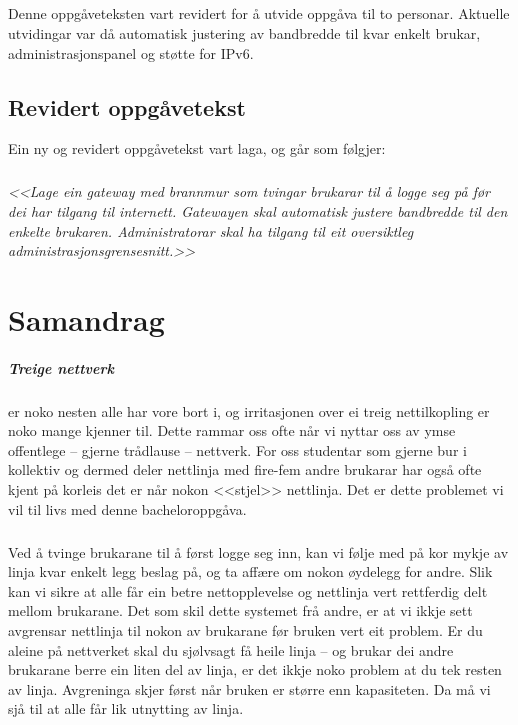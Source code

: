 \documentclass[nynorsk,12pt,a4paper,oneside]{book}
\begin{document}
\paragraph*{}
Denne oppgåveteksten vart revidert for å utvide oppgåva til to personar. Aktuelle utvidingar var då automatisk justering av bandbredde til kvar enkelt brukar, administrasjonspanel og støtte for IPv6.

\section{Revidert oppgåvetekst}
Ein ny og revidert oppgåvetekst vart laga, og går som følgjer:
\paragraph*{}
\emph{<<Lage ein gateway med brannmur som tvingar brukarar til å logge seg på før dei har tilgang til internett. Gatewayen skal automatisk justere bandbredde til den enkelte brukaren. Administratorar skal ha tilgang til eit oversiktleg administrasjonsgrensesnitt.>>}


\chapter{Samandrag}
\paragraph{Treige nettverk} er noko nesten alle har vore bort i, og irritasjonen over ei treig nettilkopling er noko mange kjenner til. Dette rammar oss ofte når vi nyttar oss av ymse offentlege -- gjerne trådlause -- nettverk. For oss studentar som gjerne bur i kollektiv og dermed deler nettlinja med fire-fem andre brukarar har også ofte kjent på korleis det er når nokon <<stjel>> nettlinja. Det er dette problemet vi vil til livs med denne bacheloroppgåva.
\paragraph{}Ved å tvinge brukarane til å først logge seg inn, kan vi følje med på kor mykje av linja kvar enkelt legg beslag på, og ta affære om nokon øydelegg for andre. Slik kan vi sikre at alle får ein betre nettopplevelse og nettlinja vert rettferdig delt mellom brukarane. Det som skil dette systemet frå andre, er at vi ikkje sett avgrensar nettlinja til nokon av brukarane før bruken vert eit problem. Er du aleine på nettverket skal du sjølvsagt få heile linja -- og brukar dei andre brukarane berre ein liten del av linja, er det ikkje noko problem at du tek resten av linja. Avgreninga skjer først når bruken er større enn kapasiteten. Da må vi sjå til at alle får lik utnytting av linja. 
\end{document}
